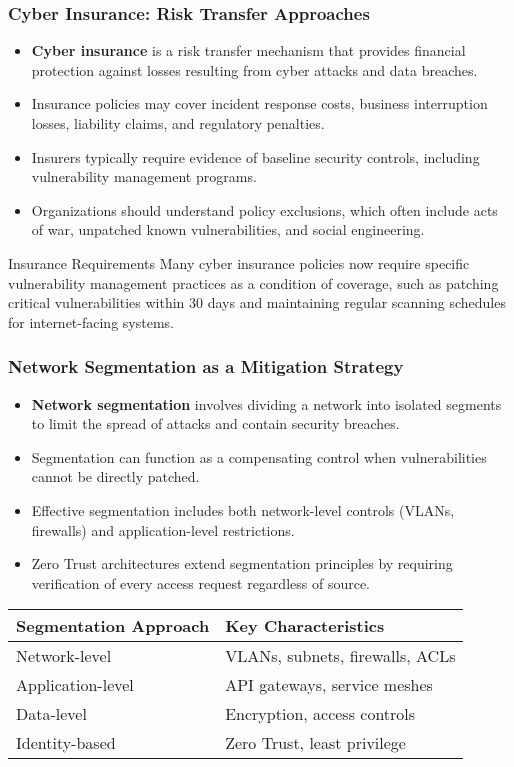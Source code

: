 \documentclass{beamer}
\begin{document}
\begin{frame}
\frametitle{Cyber Insurance: Risk Transfer Approaches}
\begin{itemize}
    \item \textbf{Cyber insurance} is a risk transfer mechanism that provides financial protection against losses resulting from cyber attacks and data breaches.
    \item Insurance policies may cover incident response costs, business interruption losses, liability claims, and regulatory penalties.
    \item Insurers typically require evidence of baseline security controls, including vulnerability management programs.
    \item Organizations should understand policy exclusions, which often include acts of war, unpatched known vulnerabilities, and social engineering.
\end{itemize}

\begin{exampleblock}{Insurance Requirements}
    \scriptsize
Many cyber insurance policies now require specific vulnerability management practices as a condition of coverage, such as patching critical vulnerabilities within 30 days and maintaining regular scanning schedules for internet-facing systems.
\end{exampleblock}
\end{frame}

\begin{frame}
\frametitle{Network Segmentation as a Mitigation Strategy}
\begin{itemize}
    \item \textbf{Network segmentation} involves dividing a network into isolated segments to limit the spread of attacks and contain security breaches.
    \item Segmentation can function as a compensating control when vulnerabilities cannot be directly patched.
    \item Effective segmentation includes both network-level controls (VLANs, firewalls) and application-level restrictions.
    \item Zero Trust architectures extend segmentation principles by requiring verification of every access request regardless of source.
\end{itemize}

\begin{table}
\scriptsize
\centering
\begin{tabular}{p{4cm}p{7cm}}
\toprule
\textbf{Segmentation Approach} & \textbf{Key Characteristics} \\
\midrule
Network-level & VLANs, subnets, firewalls, ACLs \\
Application-level & API gateways, service meshes \\
Data-level & Encryption, access controls \\
Identity-based & Zero Trust, least privilege \\
\bottomrule
\end{tabular}
\end{table}
\end{frame}
\end{document}
